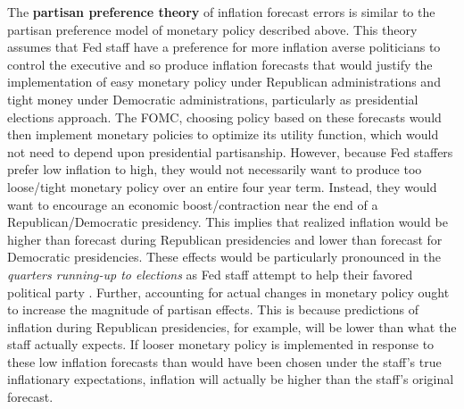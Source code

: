 \documentclass[a4paper]{article}\usepackage{graphicx, color}
\begin{document}
The {\bf{partisan preference theory}} of inflation forecast errors is similar to the partisan preference model of monetary policy described above. This theory assumes that Fed staff have a preference for more inflation averse politicians to control the executive and so produce inflation forecasts that would justify the implementation of easy monetary policy under Republican administrations and tight money under Democratic administrations, particularly as presidential elections approach. The FOMC, choosing policy based on these forecasts would then implement monetary policies to optimize its utility function, which would not need to depend upon presidential partisanship. However, because Fed staffers prefer low inflation to high, they would not necessarily want to produce too loose/tight monetary policy over an entire four year term. Instead, they would want to encourage an economic boost/contraction near the end of a Republican/Democratic presidency. This implies that realized inflation would be higher than forecast during Republican presidencies and lower than forecast for Democratic presidencies. These effects would be particularly pronounced in the {\emph{quarters running-up to elections}} as Fed staff attempt to help their favored political party \citep{Beck1987,Grier1987}. Further, accounting for actual changes in monetary policy ought to increase the magnitude of partisan effects. This is because predictions of inflation during Republican presidencies, for example, will be lower than what the staff actually expects. If looser monetary policy is implemented in response to these low inflation forecasts than would have been chosen under the staff's true inflationary expectations, inflation will actually be higher than the staff's original forecast.
\end{document}
